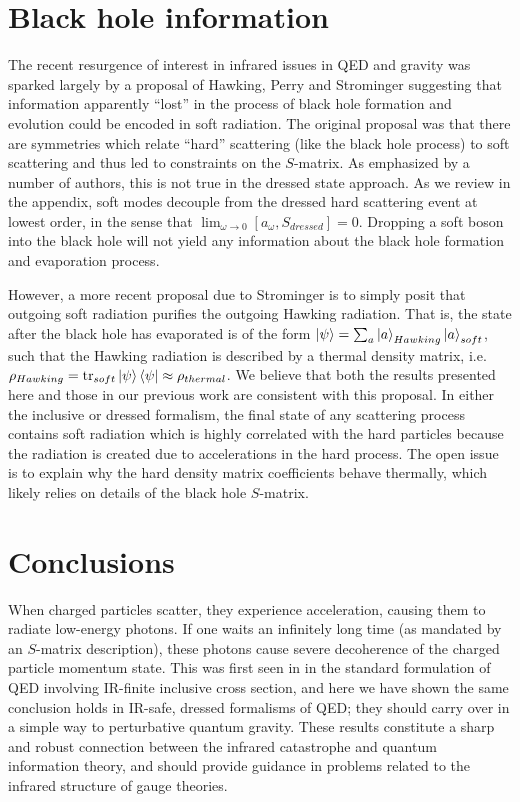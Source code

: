 \documentclass[twocolumn,prd]{revtex4}
\DeclareMathOperator{\tr}{tr}
\begin{document}
\section{Black hole information}
\label{blackholes}

The recent resurgence of interest in infrared issues in QED and gravity was sparked largely by a proposal of Hawking, Perry and Strominger suggesting that information apparently ``lost'' in the process of black hole formation and evolution could be encoded in soft radiation.\cite{Hawking:2016msc,Hawking:2016sgy} The original proposal was that there are symmetries which relate ``hard'' scattering (like the black hole process) to soft scattering and thus led to constraints on the $S$-matrix. As emphasized by a number of authors, this is not true in the dressed state approach.\cite{Mirbabayi:2016axw,Gabai:2016kuf,Gomez:2016hxz,Bousso:2017dny} As we review in the appendix, soft modes decouple from the dressed hard scattering event at lowest order, in the sense that $\lim_{\omega \to 0} [a_{\omega},S_{dressed}] = 0$. Dropping a soft boson into the black hole will not yield any information about the black hole formation and evaporation process.

However, a more recent proposal due to Strominger is to simply posit that outgoing soft radiation purifies the outgoing Hawking radiation.\cite{Strominger:2017aeh} That is, the state after the black hole has evaporated is of the form $\ket{\psi} = \sum_{a} \ket{a}_{Hawking} \ket{a}_{soft}$, such that the Hawking radiation is described by a thermal density matrix, i.e. $\rho_{Hawking} = \tr_{soft} \ket{\psi} \bra{\psi} \approx \rho_{thermal}$. We believe that both the results presented here and those in our previous work are consistent with this proposal. In either the inclusive or dressed formalism, the final state of any scattering process contains soft radiation which is highly correlated with the hard particles  because the radiation is created due to accelerations in the hard process. The open issue is to explain why the hard density matrix coefficients behave thermally, which likely relies on details of the black hole $S$-matrix.


\section{Conclusions}

When charged particles scatter, they experience acceleration, causing them to radiate low-energy photons. If one waits an infinitely long time (as mandated by an $S$-matrix description), these photons cause severe decoherence of the charged particle momentum state. This was first seen in \cite{Carney:2017jut} in the standard formulation of QED involving IR-finite inclusive cross section, and here we have shown the same conclusion holds in IR-safe, dressed formalisms of QED; they should carry over in a simple way to perturbative quantum gravity. These results constitute a sharp and robust connection between the infrared catastrophe and quantum information theory, and should provide guidance in problems related to the infrared structure of gauge theories.
\end{document}
